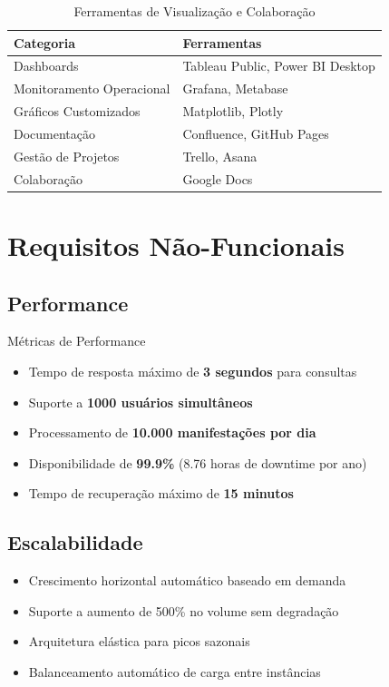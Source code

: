 \documentclass[12pt,a4paper]{article}
\begin{document}
\begin{table}[h]
\centering
\small
\begin{tabular}{@{}lp{10cm}@{}}
\toprule
\textbf{Categoria} & \textbf{Ferramentas} \\
\midrule
Dashboards & Tableau Public, Power BI Desktop \\
Monitoramento Operacional & Grafana, Metabase \\
Gráficos Customizados & Matplotlib, Plotly \\
Documentação & Confluence, GitHub Pages \\
Gestão de Projetos & Trello, Asana \\
Colaboração & Google Docs \\
\bottomrule
\end{tabular}
\caption{Ferramentas de Visualização e Colaboração}
\end{table}

\section{Requisitos Não-Funcionais}

\subsection{Performance}

\begin{highlightbox}{Métricas de Performance}
\begin{itemize}
    \item Tempo de resposta máximo de \textbf{3 segundos} para consultas
    \item Suporte a \textbf{1000 usuários simultâneos}
    \item Processamento de \textbf{10.000 manifestações por dia}
    \item Disponibilidade de \textbf{99.9\%} (8.76 horas de downtime por ano)
    \item Tempo de recuperação máximo de \textbf{15 minutos}
\end{itemize}
\end{highlightbox}

\subsection{Escalabilidade}

\begin{itemize}[leftmargin=*]
    \item Crescimento horizontal automático baseado em demanda
    \item Suporte a aumento de 500\% no volume sem degradação
    \item Arquitetura elástica para picos sazonais
    \item Balanceamento automático de carga entre instâncias
\end{itemize}
\end{document}
